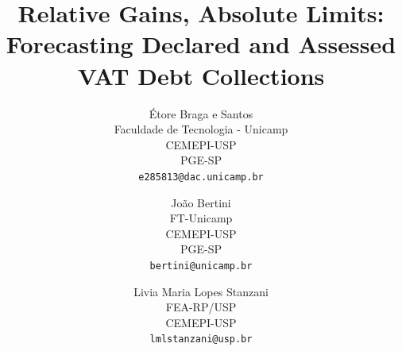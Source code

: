 \documentclass{article}
\title{Relative Gains, Absolute Limits: Forecasting Declared and Assessed VAT Debt Collections}
\author{%
  \'Etore Braga e Santos \\ Faculdade de Tecnologia - Unicamp \\ CEMEPI-USP \\ PGE-SP \\ \texttt{e285813@dac.unicamp.br}
  \and
  Jo\~ao Bertini \\ FT-Unicamp \\ CEMEPI-USP \\ PGE-SP \\ \texttt{bertini@unicamp.br}
  \and
  Livia Maria Lopes Stanzani \\ FEA-RP/USP \\ CEMEPI-USP \\ \texttt{lmlstanzani@usp.br}
}
\begin{document}
\maketitle

\begin{abstract}

\end{abstract}










\appendix




\end{document}
